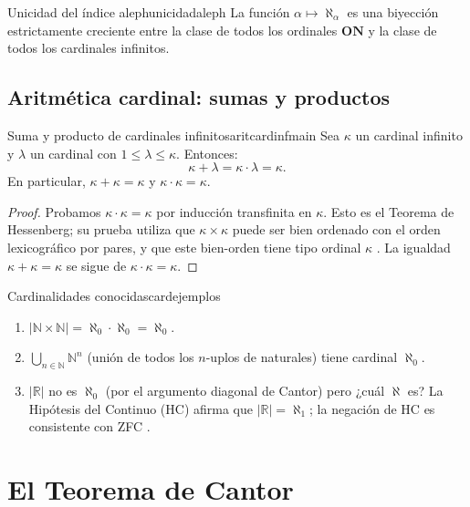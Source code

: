 \begin{corolario}{Unicidad del índice aleph}{unicidadaleph}
La función $\alpha \mapsto \aleph_\alpha$ es una biyección estrictamente creciente entre la clase de todos los ordinales $\mathbf{ON}$ y la clase de todos los cardinales infinitos.
\end{corolario}

\subsection{Aritmética cardinal: sumas y productos}

\begin{proposicion}{Suma y producto de cardinales infinitos}{aritcardinfmain}
Sea $\kappa$ un cardinal infinito y $\lambda$ un cardinal con $1 \leq \lambda \leq \kappa$. Entonces:
\[
  \kappa + \lambda = \kappa \cdot \lambda = \kappa.
\]
En particular, $\kappa + \kappa = \kappa$ y $\kappa \cdot \kappa = \kappa$.
\end{proposicion}

\begin{proof}
Probamos $\kappa \cdot \kappa = \kappa$ por inducción transfinita en $\kappa$. Esto es el Teorema de Hessenberg; su prueba utiliza que $\kappa \times \kappa$ puede ser bien ordenado con el orden lexicográfico por pares, y que este bien-orden tiene tipo ordinal $\kappa$ \cite{jech2003, enderton1977}. La igualdad $\kappa + \kappa = \kappa$ se sigue de $\kappa \cdot \kappa = \kappa$.
\end{proof}

\begin{ejemplo}{Cardinalidades conocidas}{cardejemplos}
\begin{enumerate}[leftmargin=2em, label=(\alph*)]
  \item $|\mathbb{N} \times \mathbb{N}| = \aleph_0 \cdot \aleph_0 = \aleph_0$.
  \item $\bigcup_{n \in \mathbb{N}} \mathbb{N}^n$ (unión de todos los $n$-uplos de naturales) tiene cardinal $\aleph_0$.
  \item $|\mathbb{R}|$ no es $\aleph_0$ (por el argumento diagonal de Cantor) pero ¿cuál $\aleph$ es? La Hipótesis del Continuo (HC) afirma que $|\mathbb{R}| = \aleph_1$; la negación de HC es consistente con ZFC \cite{cohen1966, godel1940}.
\end{enumerate}
\end{ejemplo}

\section{El Teorema de Cantor}

